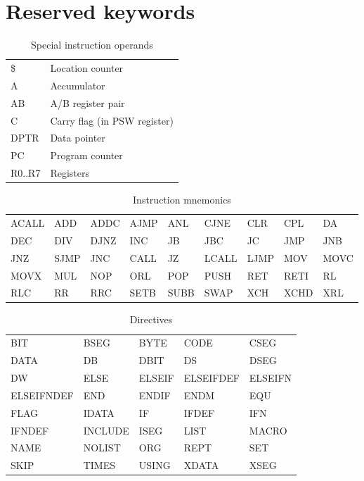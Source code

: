\documentclass[a4paper,twoside,12pt]{book}
\newcommand{\mysmallfont}{\fontsize{8pt}{10pt} \selectfont{}}
\begin{document}
	\section{Reserved keywords}
		\flushbottom
		\begin{table}[h!]
			\centering{}
			\mysmallfont{}
			\caption{Special instruction operands}
			\begin{tabular}{|ll|}
				\hline
				\$	& Location counter \\
				A	& Accumulator \\
				AB	& A/B register pair \\
				C	& Carry flag (in PSW register) \\
				DPTR	& Data pointer \\
				PC	& Program counter \\
				R0..R7	& Registers \\
				\hline
			\end{tabular}
		\end{table}
		\begin{table}[h!]
			\centering{}
			\mysmallfont{}
			\caption{Instruction mnemonics}
			\begin{tabular}{|lllllllll|}
				\hline
				ACALL	& ADD	& ADDC	& AJMP	& ANL	& CJNE	& CLR	& CPL	& DA	\\
				DEC	& DIV	& DJNZ	& INC	& JB	& JBC	& JC	& JMP	& JNB	\\
				JNZ	& SJMP	& JNC	& CALL	& JZ	& LCALL	& LJMP	& MOV	& MOVC	\\
				MOVX	& MUL	& NOP	& ORL	& POP	& PUSH	& RET	& RETI	& RL	\\
				RLC	& RR	& RRC	& SETB	& SUBB	& SWAP	& XCH	& XCHD	& XRL	\\
				\hline
			\end{tabular}
		\end{table}
		\begin{table}[h!]
			\centering{}
			\mysmallfont{}
			\caption{Directives}
			\begin{tabular}{|lllll|}
				\hline
				BIT		& BSEG		& BYTE		& CODE		& CSEG		\\
				DATA		& DB		& DBIT		& DS		& DSEG		\\
				DW		& ELSE		& ELSEIF	& ELSEIFDEF	& ELSEIFN	\\
				ELSEIFNDEF	& END		& ENDIF		& ENDM		& EQU		\\
				FLAG		& IDATA		& IF		& IFDEF		& IFN		\\
				IFNDEF		& INCLUDE	& ISEG		& LIST		& MACRO		\\
				NAME		& NOLIST	& ORG		& REPT		& SET		\\
				SKIP		& TIMES		& USING		& XDATA		& XSEG		\\
				\hline
			\end{tabular}
		\end{table}
\end{document}
